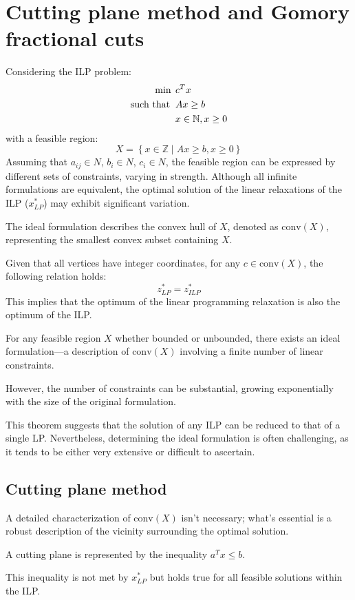 \section{Cutting plane method and Gomory fractional cuts}

Considering the ILP problem:
\begin{align*}
    \min                      \:&\: c^T x                       \\
    \textnormal{such that }     &\: Ax \geq b                   \\
                                &\: x \in \mathbb{N}, x \geq 0
\end{align*}
with a feasible region:
\[ X = \left\{ x \in \mathbb{Z} \mid Ax \geq b,x \geq 0 \right\} \]
Assuming that $a_{ij} \in N$, $b_i \in N$, $c_i \in N$, the feasible region can be expressed by different sets of constraints, varying in strength. 
Although all infinite formulations are equivalent, the optimal solution of the linear relaxations of the ILP ($x^{*}_{LP}$) may exhibit significant variation.
\begin{definition}
    The ideal formulation describes the convex hull of $X$, denoted as $\text{conv}(X)$, representing the smallest convex subset containing $X$. 
\end{definition}
Given that all vertices have integer coordinates, for any $c \in \text{conv}(X)$, the following relation holds:
\[ z^{*}_{LP} = z^{*}_{ILP} \]
This implies that the optimum of the linear programming relaxation is also the optimum of the ILP.
\begin{theorem}
    For any feasible region $X$ whether bounded or unbounded, there exists an ideal formulation—a description of $\text{conv}(X)$ involving a finite number of linear constraints.
\end{theorem}
However, the number of constraints can be substantial, growing exponentially with the size of the original formulation.

This theorem suggests that the solution of any ILP can be reduced to that of a single LP. 
Nevertheless, determining the ideal formulation is often challenging, as it tends to be either very extensive or difficult to ascertain.

\subsection{Cutting plane method}
A detailed characterization of $\text{conv}(X)$ isn't necessary; what's essential is a robust description of the vicinity surrounding the optimal solution.
\begin{definition}
    A cutting plane is represented by the inequality $a^T x \leq b$.
\end{definition}
This inequality is not met by $x^{*}_{LP}$ but holds true for all feasible solutions within the ILP.

